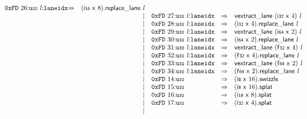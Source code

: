 $$\begin{array}{@{}l@{}rrlll@{}l@{}}
\mathtt{0xFD}~26{:}{\mathtt{u{\scriptstyle32}}}~{\mathit{l}}{:}{\mathtt{laneidx}} &\Rightarrow& (\mathsf{i{\scriptstyle16}}~\mathsf{x}~8).\mathsf{replace\_lane}~{\mathit{l}} \\ &&|&
\mathtt{0xFD}~27{:}{\mathtt{u{\scriptstyle32}}}~{\mathit{l}}{:}{\mathtt{laneidx}} &\Rightarrow& \mathsf{vextract\_lane}~(\mathsf{i{\scriptstyle32}}~\mathsf{x}~4)~{\mathit{l}} \\ &&|&
\mathtt{0xFD}~28{:}{\mathtt{u{\scriptstyle32}}}~{\mathit{l}}{:}{\mathtt{laneidx}} &\Rightarrow& (\mathsf{i{\scriptstyle32}}~\mathsf{x}~4).\mathsf{replace\_lane}~{\mathit{l}} \\ &&|&
\mathtt{0xFD}~29{:}{\mathtt{u{\scriptstyle32}}}~{\mathit{l}}{:}{\mathtt{laneidx}} &\Rightarrow& \mathsf{vextract\_lane}~(\mathsf{i{\scriptstyle64}}~\mathsf{x}~2)~{\mathit{l}} \\ &&|&
\mathtt{0xFD}~30{:}{\mathtt{u{\scriptstyle32}}}~{\mathit{l}}{:}{\mathtt{laneidx}} &\Rightarrow& (\mathsf{i{\scriptstyle64}}~\mathsf{x}~2).\mathsf{replace\_lane}~{\mathit{l}} \\ &&|&
\mathtt{0xFD}~31{:}{\mathtt{u{\scriptstyle32}}}~{\mathit{l}}{:}{\mathtt{laneidx}} &\Rightarrow& \mathsf{vextract\_lane}~(\mathsf{f{\scriptstyle32}}~\mathsf{x}~4)~{\mathit{l}} \\ &&|&
\mathtt{0xFD}~32{:}{\mathtt{u{\scriptstyle32}}}~{\mathit{l}}{:}{\mathtt{laneidx}} &\Rightarrow& (\mathsf{f{\scriptstyle32}}~\mathsf{x}~4).\mathsf{replace\_lane}~{\mathit{l}} \\ &&|&
\mathtt{0xFD}~33{:}{\mathtt{u{\scriptstyle32}}}~{\mathit{l}}{:}{\mathtt{laneidx}} &\Rightarrow& \mathsf{vextract\_lane}~(\mathsf{f{\scriptstyle64}}~\mathsf{x}~2)~{\mathit{l}} \\ &&|&
\mathtt{0xFD}~34{:}{\mathtt{u{\scriptstyle32}}}~{\mathit{l}}{:}{\mathtt{laneidx}} &\Rightarrow& (\mathsf{f{\scriptstyle64}}~\mathsf{x}~2).\mathsf{replace\_lane}~{\mathit{l}} \\ &&|&
\mathtt{0xFD}~14{:}{\mathtt{u{\scriptstyle32}}} &\Rightarrow& (\mathsf{i{\scriptstyle8}}~\mathsf{x}~16).\mathsf{swizzle} \\ &&|&
\mathtt{0xFD}~15{:}{\mathtt{u{\scriptstyle32}}} &\Rightarrow& (\mathsf{i{\scriptstyle8}}~\mathsf{x}~16).\mathsf{splat} \\ &&|&
\mathtt{0xFD}~16{:}{\mathtt{u{\scriptstyle32}}} &\Rightarrow& (\mathsf{i{\scriptstyle16}}~\mathsf{x}~8).\mathsf{splat} \\ &&|&
\mathtt{0xFD}~17{:}{\mathtt{u{\scriptstyle32}}} &\Rightarrow& (\mathsf{i{\scriptstyle32}}~\mathsf{x}~4).\mathsf{splat} \\ &&|&

\end{array}$$
